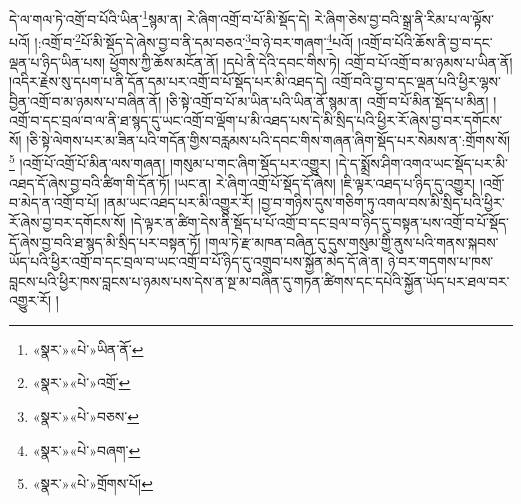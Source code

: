 དེ་ལ་གལ་ཏེ་འགྲོ་བ་པོའི་ཡིན་\footnote{«སྣར་»«པེ་»ཡིན་ནོ་}སྙམ་ན། རེ་ཞིག་འགྲོ་བ་པོ་མི་སྡོད་དེ། རེ་ཞིག་ཅེས་བྱ་བའི་སྒྲ་ནི་རིམ་པ་ལ་ལྟོས་པའོ། །:འགྲོ་བ་\footnote{«སྣར་»«པེ་»འགྲོ་}པོ་མི་སྡོད་དེ་ཞེས་བྱ་བ་ནི་དམ་བཅའ་\footnote{«སྣར་»«པེ་»བཅས་}བ་ཉེ་བར་གཞག་\footnote{«སྣར་»«པེ་»བཞག་}པའོ། །འགྲོ་བ་པོའི་ཆོས་ནི་བྱ་བ་དང་ལྡན་པ་ཉིད་ཡིན་པས། ཕྱོགས་ཀྱི་ཆོས་མངོན་ནོ། །དཔེ་ནི་དེའི་དབང་གིས་ཏེ། འགྲོ་བ་པོ་འགྲོ་བ་མ་ཉམས་པ་ཡིན་ནོ། །འདིར་རྗེས་སུ་དཔག་པ་ནི་དོན་དམ་པར་འགྲོ་བ་པོ་སྡོད་པར་མི་འཐད་དེ། འགྲོ་བའི་བྱ་བ་དང་ལྡན་པའི་ཕྱིར་ལྷས་བྱིན་འགྲོ་བ་མ་ཉམས་པ་བཞིན་ནོ། །ཅི་སྟེ་འགྲོ་བ་པོ་མ་ཡིན་པའི་ཡིན་ནོ་སྙམ་ན། འགྲོ་བ་པོ་མིན་སྡོད་པ་མིན། །འགྲོ་བ་དང་བྲལ་བ་ལ་ནི་ཐ་སྙད་དུ་ཡང་འགྲོ་བ་ལྡོག་པ་མི་འཐད་པས་དེ་མི་སྲིད་པའི་ཕྱིར་རོ་ཞེས་བྱ་བར་དགོངས་སོ། །ཅི་སྟེ་ལེགས་པར་མ་ཟིན་པའི་གདོན་གྱིས་བརླམས་པའི་དབང་གིས་གཞན་ཞིག་སྡོད་པར་སེམས་ན་:གྲོགས་སོ།\footnote{«སྣར་»«པེ་»གྲོགས་པོ།} །འགྲོ་པོ་འགྲོ་པོ་མིན་ལས་གཞན། །གསུམ་པ་གང་ཞིག་སྡོད་པར་འགྱུར། །དེ་ད་སྨྲོས་ཤིག་འགའ་ཡང་སྡོད་པར་མི་འཐད་དོ་ཞེས་བྱ་བའི་ཚིག་གི་དོན་ཏོ། །ཡང་ན། རེ་ཞིག་འགྲོ་པོ་སྡོད་དོ་ཞེས། །ཇི་ལྟར་འཐད་པ་ཉིད་དུ་འགྱུར། །འགྲོ་བ་མེད་ན་འགྲོ་བ་པོ། །ནམ་ཡང་འཐད་པར་མི་འགྱུར་རོ། །བྱ་བ་གཉིས་དུས་གཅིག་ཏུ་འགལ་བས་མི་སྲིད་པའི་ཕྱིར་རོ་ཞེས་བྱ་བར་དགོངས་སོ། །དེ་ལྟར་ན་ཚིག་དེས་ནི་སྡོད་པ་པོ་འགྲོ་བ་དང་བྲལ་བ་ཉིད་དུ་བསྟན་པས་འགྲོ་བ་པོ་སྡོད་དོ་ཞེས་བྱ་བའི་ཐ་སྙད་མི་སྲིད་པར་བསྟན་ཏོ། །གལ་ཏེ་རྫ་མཁན་བཞིན་དུ་དུས་གསུམ་གྱི་ནུས་པའི་གནས་སྐབས་ཡོད་པའི་ཕྱིར་འགྲོ་བ་དང་བྲལ་བ་ཡང་འགྲོ་བ་པོ་ཉིད་དུ་འགྲུབ་པས་སྐྱོན་མེད་དོ་ཞེ་ན། ཉེ་བར་གདགས་པ་ཁས་བླངས་པའི་ཕྱིར་ཁས་བླངས་པ་ཉམས་པས་དེས་ན་སྔ་མ་བཞིན་དུ་གཏན་ཚིགས་དང་དཔེའི་སྐྱོན་ཡོད་པར་ཐལ་བར་འགྱུར་རོ། །
